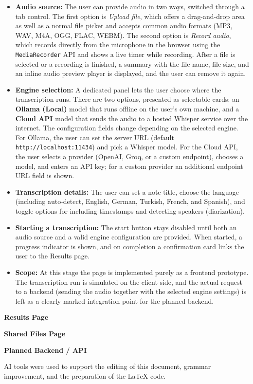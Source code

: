 \documentclass[11pt,a4paper]{article}
\begin{document}
\begin{itemize}
    \item \textbf{Audio source:} The user can provide audio in two ways, switched through a tab control. The first option is \textit{Upload file}, which offers a drag-and-drop area as well as a normal file picker and accepts common audio formats (MP3, WAV, M4A, OGG, FLAC, WEBM). The second option is \textit{Record audio}, which records directly from the microphone in the browser using the \texttt{MediaRecorder} API and shows a live timer while recording. After a file is selected or a recording is finished, a summary with the file name, file size, and an inline audio preview player is displayed, and the user can remove it again.
    \item \textbf{Engine selection:} A dedicated panel lets the user choose where the transcription runs. There are two options, presented as selectable cards: an \textbf{Ollama (Local)} model that runs offline on the user’s own machine, and a \textbf{Cloud API} model that sends the audio to a hosted Whisper service over the internet. The configuration fields change depending on the selected engine. For Ollama, the user can set the server URL (default \texttt{http://localhost:11434}) and pick a Whisper model. For the Cloud API, the user selects a provider (OpenAI, Groq, or a custom endpoint), chooses a model, and enters an API key; for a custom provider an additional endpoint URL field is shown.
    \item \textbf{Transcription details:} The user can set a note title, choose the language (including auto-detect, English, German, Turkish, French, and Spanish), and toggle options for including timestamps and detecting speakers (diarization).
    \item \textbf{Starting a transcription:} The start button stays disabled until both an audio source and a valid engine configuration are provided. When started, a progress indicator is shown, and on completion a confirmation card links the user to the Results page.
    \item \textbf{Scope:} At this stage the page is implemented purely as a frontend prototype. The transcription run is simulated on the client side, and the actual request to a backend (sending the audio together with the selected engine settings) is left as a clearly marked integration point for the planned backend.
\end{itemize}


\textbf{Results Page}


\textbf{Shared Files Page}


\textbf{Planned Backend / API}



\vfill
{\footnotesize AI tools were used to support the editing of this document, grammar improvement, and the preparation of the LaTeX code.}
\end{document}
